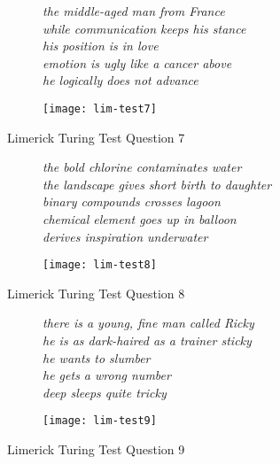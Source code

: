 \begin{figure}[H]
\centering
\begin{subfigure}[t!]{0.45\textwidth}
	\centering
    \textit{the middle-aged man from France\\while communication keeps his stance\\his position is in love\\emotion is ugly like a cancer above\\he logically does not advance}
\end{subfigure}
\begin{subfigure}[t!]{0.45\textwidth}
	\centering
    \texttt{[image: lim-test7]}
\end{subfigure}
\caption{Limerick Turing Test Question 7}
\label{fig:lim-test7}
\end{figure}

\begin{figure}[H]
\centering
\begin{subfigure}[t!]{0.45\textwidth}
	\centering
    \textit{the bold chlorine contaminates water\\the landscape gives short birth to daughter\\binary compounds crosses lagoon\\chemical element goes up in balloon\\derives inspiration underwater}
\end{subfigure}
\begin{subfigure}[t!]{0.45\textwidth}
	\centering
    \texttt{[image: lim-test8]}
\end{subfigure}
\caption{Limerick Turing Test Question 8}
\label{fig:lim-test8}
\end{figure}

\begin{figure}[H]
\centering
\begin{subfigure}[t!]{0.45\textwidth}
	\centering
    \textit{there is a young, fine man called Ricky\\he is as dark-haired as a trainer sticky\\he wants to slumber\\he gets a wrong number\\deep sleeps quite tricky}
\end{subfigure}
\begin{subfigure}[t!]{0.45\textwidth}
	\centering
    \texttt{[image: lim-test9]}
\end{subfigure}
\caption{Limerick Turing Test Question 9}
\label{fig:lim-test9}
\end{figure}


